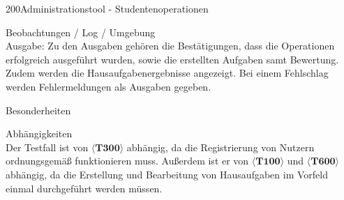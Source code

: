 \begin{testcase}{200}{Administrationstool - Studentenoperationen}
\item[Beobachtungen / Log / Umgebung]~\\
Ausgabe:
Zu den Ausgaben gehören die Bestätigungen, dass die Operationen erfolgreich ausgeführt wurden, sowie die erstellten Aufgaben samt Bewertung. Zudem werden die Hausaufgabenergebnisse angezeigt. 
Bei einem Fehlschlag werden Fehlermeldungen als Ausgaben gegeben.\\

\item[Besonderheiten]~\\

\item[Abhängigkeiten]~\\
Der Testfall ist von $\langle\textbf{T300}\rangle$ abhängig, da die Registrierung von Nutzern ordnungsgemäß funktionieren muss.
Außerdem ist er von $\langle\textbf{T100}\rangle$ und $\langle\textbf{T600}\rangle$ abhängig, da die Erstellung und Bearbeitung von Hausaufgaben im Vorfeld einmal durchgeführt werden müssen.

\end{testcase}

